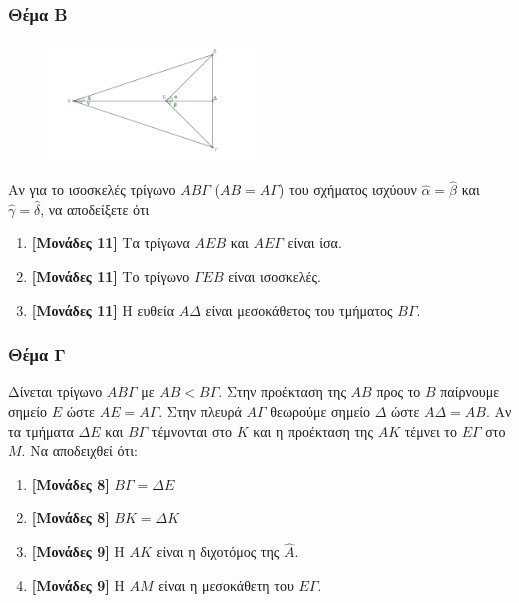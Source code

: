 \documentclass[12pt]{article}
\begin{document}
\section*{Θέμα Β}
  \noindent
  \begin{figure}
    \centering
    \vspace{-60pt}
    \includegraphics[width=0.5\textwidth]{2017AGeoDiag}
  \end{figure}
  Αν για το ισοσκελές τρίγωνο $ΑΒΓ$ ($ΑΒ=ΑΓ$) του σχήματος ισχύουν $\hat{α}=\hat{β}$ και $\hat{γ}=\hat{δ}$, να αποδείξετε ότι
  \begin{enumerate}
    \item \textbf{[Μονάδες 11]} Τα τρίγωνα $ΑΕΒ$ και $ΑΕΓ$ είναι ίσα.
    \item \textbf{[Μονάδες 11]} Το τρίγωνο $ΓΕΒ$ είναι ισοσκελές.
    \item \textbf{[Μονάδες 11]} Η ευθεία $ΑΔ$ είναι μεσοκάθετος του τμήματος $ΒΓ$.
  \end{enumerate}

\section*{Θέμα Γ}
  \noindent
  Δίνεται τρίγωνο $ΑΒΓ$ με $ΑΒ<ΒΓ$. Στην προέκταση της $ΑΒ$ προς το $Β$ παίρνουμε σημείο $Ε$ ώστε $ΑΕ=ΑΓ$. Στην πλευρά $ΑΓ$ θεωρούμε σημείο $Δ$ ώστε $ΑΔ=ΑΒ$. Αν τα τμήματα $ΔΕ$ και $ΒΓ$ τέμνονται στο $Κ$ και η προέκταση της $ΑΚ$ τέμνει το $ΕΓ$ στο $Μ$. Να αποδειχθεί ότι:
  \begin{enumerate}
    \item \textbf{[Μονάδες 8]} $ΒΓ=ΔΕ$
    \item \textbf{[Μονάδες 8]} $ΒΚ=ΔΚ$
    \item \textbf{[Μονάδες 9]} Η $ΑΚ$ είναι η διχοτόμος της $\hat{Α}$.
    \item \textbf{[Μονάδες 9]} Η $ΑΜ$ είναι η μεσοκάθετη του $ΕΓ$.
  \end{enumerate}

\vspace{3\baselineskip}

\part*{}
\end{document}
